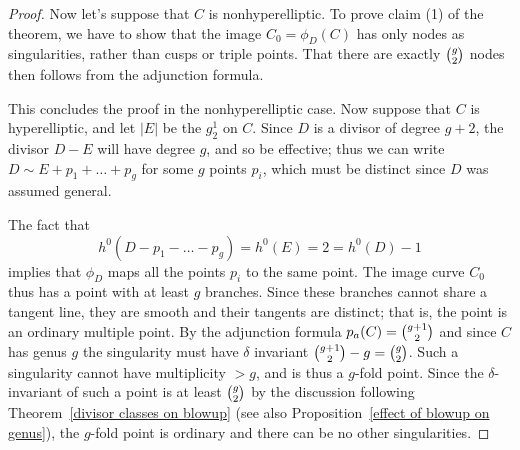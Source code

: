 \begin{proof}
\smallbreak
Now let's suppose that $C$ is nonhyperelliptic.
To prove 
claim (1) of the theorem,
we
have to show  
that the image $C_0 = \phi_D(C)$ 
has only nodes as singularities,
rather than cusps or triple points.
That there are exactly
$\tbinom{g}{2}$ nodes then follows from the 
adjunction formula.
%


\noindent This concludes the proof in the nonhyperelliptic case. Now
suppose that $C$ is hyperelliptic, and let $|E|$ be the  $g^1_2$ on
$C$. 
Since $D$ is a
divisor of degree $g+2$, the divisor $D - E$ will
have degree $g$, and so be effective; thus we can write
$D \sim E + p_1 + \dots + p_g$
for some 
$g$ points $p_i$, which must be distinct since $D$ was assumed general.

The fact that
$$
h^0(D - p_1 - \dots - p_g) = h^0(E) = 2 = h^0(D) - 1
$$
implies that $\phi_D$ maps all the points $p_i$ to the same point. The
image curve $C_0$ thus has a point with at least $g$ branches. Since
these branches cannot share a tangent line,
they are smooth and their tangents are distinct; that is, the point is
an ordinary multiple point. By the adjunction
%
formula $p_a(C) = \tbinom{g+1}{2}$ and since $C$ has genus $g$ the
singularity must have $\delta$ invariant
$\tbinom{g+1}{2} -g = \tbinom{g}{2}$. Such a singularity cannot have
multiplicity $>g$, and is thus a $g$-fold point. Since the
$\delta$-invariant of such a point is at least $\tbinom{g}{2}$ by
the discussion following Theorem~\ref{divisor classes on blowup}
(see also
Proposition~\ref{effect of blowup on genus}), the $g$-fold point is ordinary and there can be no other
singularities.
\end{proof}

